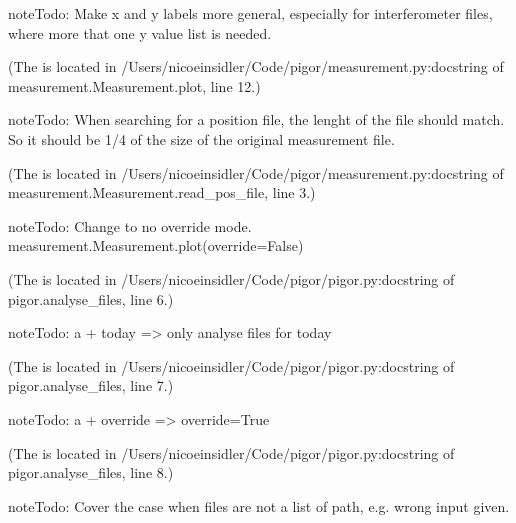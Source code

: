 \documentclass[letterpaper,10pt,english]{sphinxmanual}
\begin{document}
\begin{sphinxadmonition}{note}{Todo:}
Make x and y labels more general, especially for interferometer files, where more that one y value list is needed.
\end{sphinxadmonition}

(The {\hyperref[\detokenize{measurement:index-5}]{}} is located in /Users/nicoeinsidler/Code/pigor/measurement.py:docstring of measurement.Measurement.plot, line 12.)

\begin{sphinxadmonition}{note}{Todo:}
When searching for a position file, the lenght of the file should match. So it should be 1/4 of the size of the original measurement file.
\end{sphinxadmonition}

(The {\hyperref[\detokenize{measurement:index-6}]{}} is located in /Users/nicoeinsidler/Code/pigor/measurement.py:docstring of measurement.Measurement.read\_pos\_file, line 3.)

\begin{sphinxadmonition}{note}{Todo:}
Change to no override mode. measurement.Measurement.plot(override=False)
\end{sphinxadmonition}

(The {\hyperref[\detokenize{pigor:index-0}]{}} is located in /Users/nicoeinsidler/Code/pigor/pigor.py:docstring of pigor.analyse\_files, line 6.)

\begin{sphinxadmonition}{note}{Todo:}
a + today =\textgreater{} only analyse files for today
\end{sphinxadmonition}

(The {\hyperref[\detokenize{pigor:index-1}]{}} is located in /Users/nicoeinsidler/Code/pigor/pigor.py:docstring of pigor.analyse\_files, line 7.)

\begin{sphinxadmonition}{note}{Todo:}
a + override =\textgreater{} override=True
\end{sphinxadmonition}

(The {\hyperref[\detokenize{pigor:index-2}]{}} is located in /Users/nicoeinsidler/Code/pigor/pigor.py:docstring of pigor.analyse\_files, line 8.)

\begin{sphinxadmonition}{note}{Todo:}
Cover the case when files are not a list of path, e.g. wrong input given.
\end{sphinxadmonition}
\end{document}
